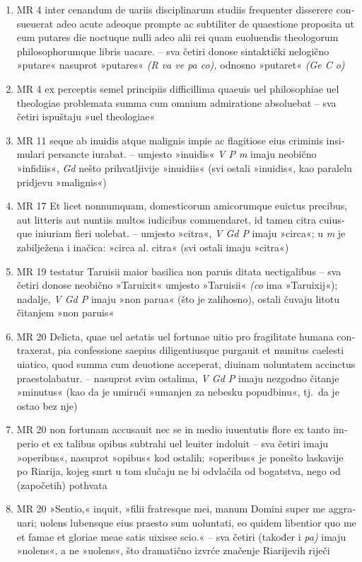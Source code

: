 \documentclass[a5paper,twoside]{article}
\begin{document}
\begin{enumerate}[label=\alph*)]
\item MR 4 \textlatin{inter cenandum de uariis disciplinarum studiis frequenter disserere consueuerat adeo acute adeoque prompte ac subtiliter de quaestione proposita ut eum putares die noctuque nulli adeo alii rei quam euoluendis theologorum philosophorumque libris uacare.} – sva četiri donose sintaktički nelogično »putare« nasuprot »putares« \textit{(R va ve pa co),} odnosno »putaret« \textit{(Ge C o)}
\item MR 4 \textlatin{ex perceptis semel principiis difficillima quaeuis uel philosophiae uel theologiae problemata summa cum omnium admiratione absoluebat} – sva četiri ispuštaju »uel theologiae«
\item MR 11 \textlatin{seque ab inuidis atque malignis impie ac flagitiose eius criminis insimulari persancte iurabat.} – umjesto »inuidis« \textit{V P m} imaju neobično »infidiis«, \textit{Gd} nešto prihvatljivije »inuidiis« (svi ostali »inuidis«, kao paralelu pridjevu »malignis«)
\item MR 17 \textlatin{Et licet nonnumquam, domesticorum amicorumque euictus precibus, aut litteris aut nuntiis multos iudicibus commendaret, id tamen citra cuiusque iniuriam fieri uolebat.} – umjesto »citra«, \textit{V Gd P} imaju »circa«; u \textit{m} je zabilježena i inačica: »circa al. citra« (svi ostali imaju »citra«)
\item MR 19 \textlatin{testatur Taruisii maior basilica non paruis ditata uectigalibus} – sva četiri donose neobično »Taruixit« umjesto »Taruisii« \textit{(co} ima »Taruixij«); nadalje, \textit{V Gd P} imaju »non parua« (što je zalihosno), ostali čuvaju litotu čitanjem »non paruis«
\item MR 20 \textlatin{Delicta, quae uel aetatis uel fortunae uitio pro fragilitate humana contraxerat, pia confessione saepius diligentiusque purgauit et munitus caelesti uiatico, quod summa cum deuotione acceperat, diuinam uoluntatem accinctus praestolabatur.} – nasuprot svim ostalima, \textit{V Gd P} imaju nezgodno čitanje »minutus« (kao da je umirući »umanjen za nebesku popudbinu«, tj.\ da je ostao bez nje)
\item MR 20 \textlatin{non fortunam accusauit nec se in medio iuuentutis flore ex tanto imperio et ex talibus opibus subtrahi uel leuiter indoluit} – sva četiri imaju »operibus«, nasuprot »opibus« kod ostalih; »operibus« je ponešto laskavije po Riarija, kojeg smrt u tom slučaju ne bi odvlačila od bogatstva, nego od (započetih) pothvata
\item MR 20 \textlatin{»Sentio,« inquit, »filii fratresque mei, manum Domini super me aggrauari; uolens lubensque eius praesto sum uoluntati, eo quidem libentior quo me et famae et gloriae meae satis uixisse scio.«} – sva četiri (također i \textit{pa)} imaju »nolens«, a ne »uolens«, što dramatično izvrće značenje Riarijevih riječi
\end{enumerate}
\end{document}
